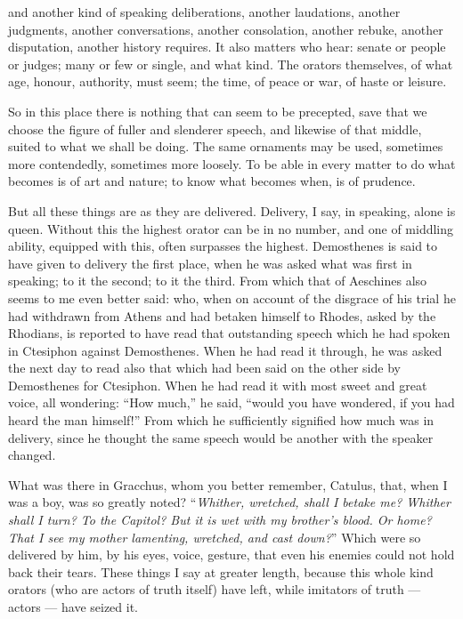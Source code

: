  and another kind of speaking deliberations, another laudations, another judgments, another conversations, another consolation, another rebuke, another disputation, another history requires. It also matters who hear: senate or people or judges; many or few or single, and what kind. The orators themselves, of what age, honour, authority, must seem; the time, of peace or war, of haste or leisure.

 So in this place there is nothing that can seem to be precepted, save that we choose the figure of fuller and slenderer speech, and likewise of that middle, suited to what we shall be doing. The same ornaments may be used, sometimes more contendedly, sometimes more loosely. To be able in every matter to do what becomes is of art and nature; to know what becomes when, is of prudence.

 But all these things are as they are delivered. Delivery, I say, in speaking, alone is queen. Without this the highest orator can be in no number, and one of middling ability, equipped with this, often surpasses the highest. Demosthenes is said to have given to delivery the first place, when he was asked what was first in speaking; to it the second; to it the third. From which that of Aeschines also seems to me even better said: who, when on account of the disgrace of his trial he had withdrawn from Athens and had betaken himself to Rhodes, asked by the Rhodians, is reported to have read that outstanding speech which he had spoken in Ctesiphon against Demosthenes. When he had read it through, he was asked the next day to read also that which had been said on the other side by Demosthenes for Ctesiphon. When he had read it with most sweet and great voice, all wondering: ``How much,'' he said, ``would you have wondered, if you had heard the man himself!'' From which he sufficiently signified how much was in delivery, since he thought the same speech would be another with the speaker changed.

 What was there in Gracchus, whom you better remember, Catulus, that, when I was a boy, was so greatly noted? ``\textit{Whither, wretched, shall I betake me? Whither shall I turn? To the Capitol? But it is wet with my brother's blood. Or home? That I see my mother lamenting, wretched, and cast down?}'' Which were so delivered by him, by his eyes, voice, gesture, that even his enemies could not hold back their tears. These things I say at greater length, because this whole kind orators (who are actors of truth itself) have left, while imitators of truth — actors — have seized it.

